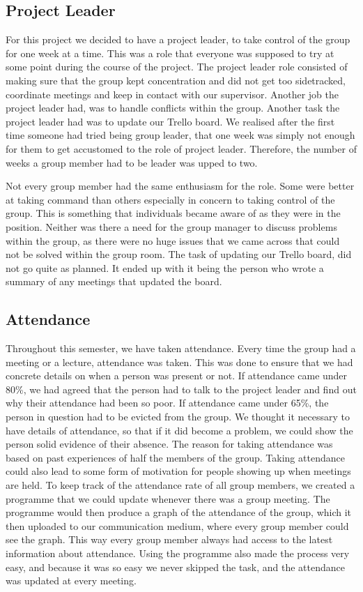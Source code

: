 \subsection{Project Leader}
For this project we decided to have a project leader, to take control of the group for one week at a time. 
This was a role that everyone was supposed to try at some point during the course of the project. 
The project leader role consisted of making sure that the group kept concentration and did not get too sidetracked, coordinate meetings and keep in contact with our supervisor. 
Another job the project leader had, was to handle conflicts within the group. 
Another task the project leader had was to update our Trello board.
We realised after the first time someone had tried being group leader, that one week was simply not enough for them to get accustomed to the role of project leader.
Therefore, the number of weeks a group member had to be leader was upped to two.

Not every group member had the same enthusiasm for the role. 
Some were better at taking command than others especially in concern to taking control of the group.
This is something that individuals became aware of as they were in the position.
Neither was there a need for the group manager to discuss problems within the group, as there were no huge issues that we came across that could not be solved within the group room.
The task of updating our Trello board, did not go quite as planned. 
It ended up with it being the person who wrote a summary of any meetings that updated the board.

\subsection{Attendance}
Throughout this semester, we have taken attendance. 
Every time the group had a meeting or a lecture, attendance was taken. 
This was done to ensure that we had concrete details on when a person was present or not. 
If attendance came under 80\%, we had agreed that the person had to talk to the project leader and find out why their attendance had been so poor. 
If attendance came under 65\%, the person in question had to be evicted from the group. 
We thought it necessary to have details of attendance, so that if it did become a problem, we could show the person solid evidence of their absence. 
The reason for taking attendance was based on past experiences of half the members of the group. 
Taking attendance could also lead to some form of motivation for people showing up when meetings are held.
To keep track of the attendance rate of all group members, we created a programme that we could update whenever there was a group meeting. 
The programme would then produce a graph of the attendance of the group, which it then uploaded to our communication medium, where every group member could see the graph. 
This way every group member always had access to the latest information about attendance.
Using the programme also made the process very easy, and because it was so easy we never skipped the task, and the attendance was updated at every meeting.

